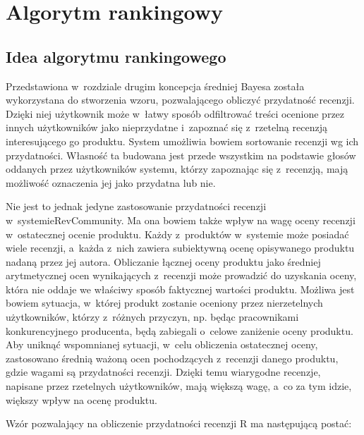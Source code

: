 \chapter{Algorytm rankingowy}

\section{Idea algorytmu rankingowego}

Przedstawiona w~rozdziale drugim koncepcja średniej Bayesa została wykorzystana do stworzenia wzoru, pozwalającego obliczyć przydatność recenzji. Dzięki niej użytkownik może w~łatwy sposób odfiltrować treści ocenione przez innych użytkowników jako nieprzydatne i~zapoznać się z~rzetelną recenzją interesującego go produktu. System umożliwia bowiem sortowanie recenzji wg ich przydatności. Własność ta budowana jest przede wszystkim na podstawie głosów oddanych przez użytkowników systemu, którzy zapoznając się z~recenzją, mają możliwość oznaczenia jej jako przydatna lub nie.

Nie jest to jednak jedyne zastosowanie przydatności recenzji w~systemie\linebreak RevCommunity. Ma ona bowiem także wpływ na wagę oceny recenzji w~ostatecznej ocenie produktu. Każdy z~produktów w~systemie może posiadać wiele recenzji, a~każda z~nich zawiera subiektywną ocenę opisywanego produktu nadaną przez jej autora. Obliczanie łącznej oceny produktu jako średniej arytmetycznej ocen wynikających z~recenzji może prowadzić do uzyskania oceny, która nie oddaje we właściwy sposób faktycznej wartości produktu. Możliwa jest bowiem sytuacja, w~której produkt zostanie oceniony przez nierzetelnych użytkowników, którzy z~różnych przyczyn, np. będąc pracownikami konkurencyjnego producenta, będą zabiegali o~celowe zaniżenie oceny produktu. Aby uniknąć wspomnianej sytuacji, w~celu obliczenia ostatecznej oceny, zastosowano średnią ważoną ocen pochodzących z~recenzji danego produktu, gdzie wagami są przydatności recenzji. Dzięki temu wiarygodne recenzje, napisane przez rzetelnych użytkowników, mają większą wagę, a~co za tym idzie, większy wpływ na ocenę produktu.

Wzór pozwalający na obliczenie przydatności recenzji R ma następującą postać:

